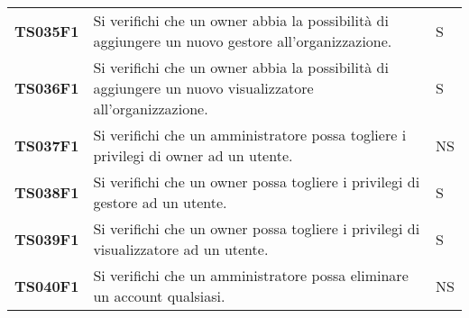 \documentclass[../../piano-di-qualifica.tex]{subfiles}
\begin{document}
\begin{longtable}[H]{>{\centering\bfseries}m{3cm} >{}m{10cm} >{\centering\arraybackslash}m{3cm}}
  TS035F1            & Si verifichi che un owner abbia la possibilità di aggiungere un nuovo gestore all'organizzazione.
                     & S                                                                                                                                                                                                                                                   \\

  TS036F1            & Si verifichi che un owner abbia la possibilità di aggiungere un nuovo visualizzatore all'organizzazione.
                     & S                                                                                                                                                                                                                                                   \\

  TS037F1            & Si verifichi che un amministratore possa togliere i privilegi di owner ad un utente.
                     & NS                                                                                                                                                                                                                                                  \\

  TS038F1            & Si verifichi che un owner possa togliere i privilegi di gestore ad un utente.
                     & S                                                                                                                                                                                                                                                   \\

  TS039F1            & Si verifichi che un owner possa togliere i privilegi di visualizzatore ad un utente.
                     & S                                                                                                                                                                                                                                                   \\

  TS040F1            & Si verifichi che un amministratore possa eliminare un account qualsiasi.
                     & NS                                                                                                                                                                                                                                                  \\


\end{longtable}
\end{document}

